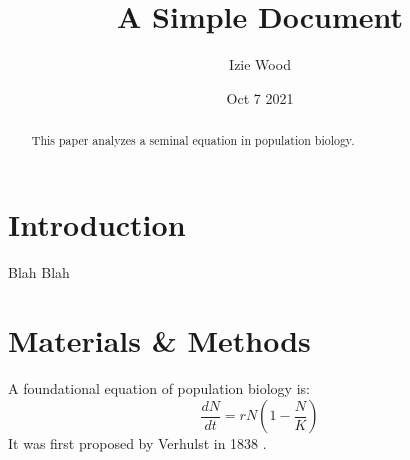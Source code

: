 \documentclass[12pt]{article}
\title{A Simple Document}
\author{Izie Wood}
\date{Oct 7 2021}
\begin{document}
    \maketitle
    \begin{abstract}
        This paper analyzes a seminal equation in population biology.
    \end{abstract}
    \section{Introduction}
        Blah Blah
    \section{Materials \&  Methods}
    A foundational equation of population biology is:
        \begin{equation}
            \frac{dN}{dt} = r N (1 - \frac{N}{K})
        \end{equation}
    It was first proposed by Verhulst in 1838 \cite{verhulst1838notice}.
    
    
\end{document}
